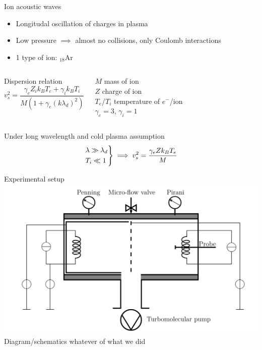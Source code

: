 \documentclass[10pt]{beamer}
\newcommand{\electron}[0]{$e^{-}$}
\begin{document}
\begin{frame}{Ion acoustic waves}
    \begin{itemize}
        \item Longitudal oscillation of charges in plasma
        \item Low pressure $\implies$ almost no collisions, only Coulomb interactions
        \item 1 type of ion: $_{18}$Ar
    \end{itemize}
    
    \vspace{0.5cm}
    \begin{columns}[T]
        Dispersion relation
        \begin{equation*}
            v_s^2 = \frac{\gamma_e Z_i k_B T_e + \gamma_i k_B T_i}{M(1+\gamma_e(k\lambda_d)^2)}
        \end{equation*}
        
        \vfill
        \centering
        $M$ mass of ion \\
        $Z$ charge of ion \\
        $T_e$/$T_i$ temperature of \electron/ion \\
        $\gamma_e=3$, $\gamma_i=1$
        \vfill
    \end{columns}

    \vspace{0.8cm}
    Under long wavelength and cold plasma assumption
    \begin{equation*}
        \begin{rcases}
            \lambda \gg \lambda_d \\
            T_i \ll 1
        \end{rcases}
        \implies v_s^2 = \frac{\gamma_e Z k_B T_e}{M}
    \end{equation*}
\end{frame}


\begin{frame}{Experimental setup}
    \centering
    \includegraphics[width=\textwidth]{../figures/experimental_setup_Willemin_Zahar.png} 
    \\
    Diagram/schematics whatever of what we did
\end{frame}
\end{document}

